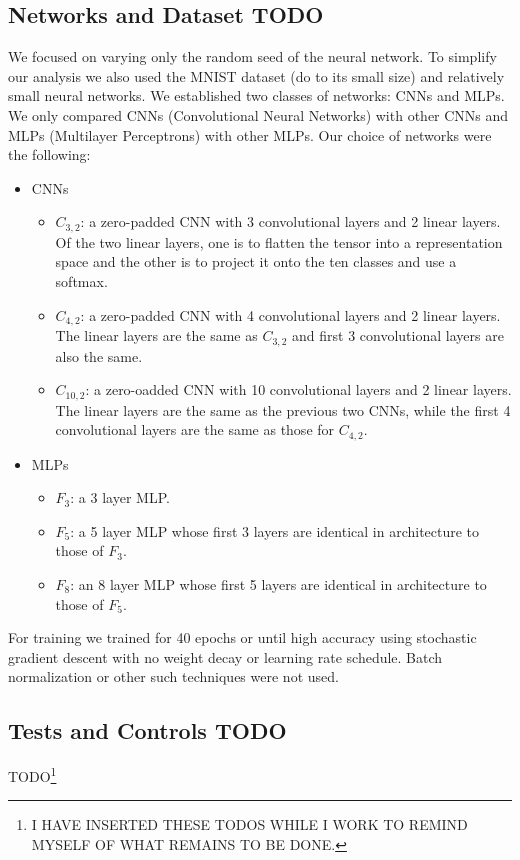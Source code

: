 \documentclass{article} %
\begin{document}
\subsection{Networks and Dataset TODO}
We focused on varying only the random seed of the neural network. To simplify our analysis we also used the MNIST dataset
(do to its small size) and relatively small neural networks. We established two classes of networks: CNNs and MLPs.
We only compared CNNs (Convolutional Neural Networks) with other CNNs and MLPs (Multilayer Perceptrons) with other MLPs.
Our choice of networks were the following:
\begin{itemize}
   \item CNNs
   \begin{itemize}
      \item \(C_{3,2}\): a zero-padded CNN with 3 convolutional layers and 2 linear layers. Of the two linear layers, one is to flatten the tensor into a representation space and the other is to project it onto the ten classes and use a softmax.
      \item \(C_{4,2}\): a zero-padded CNN with 4 convolutional layers and 2 linear layers. The linear layers are the same as \(C_{3,2}\) and first 3 convolutional layers are also the same.
      \item \(C_{10,2}\): a zero-oadded CNN with 10 convolutional layers and 2 linear layers. The linear layers are the same as the previous two CNNs, while the first 4 convolutional layers are the same as those for \(C_{4,2}\).
   \end{itemize}
   \item MLPs
   \begin{itemize}
      \item \(F_{3}\): a 3 layer MLP.
      \item \(F_{5}\): a 5 layer MLP whose first 3 layers are identical in architecture to those of \(F_{3}\).
      \item \(F_{8}\): an 8 layer MLP whose first 5 layers are identical in architecture to those of \(F_{5}\).
   \end{itemize}
\end{itemize}

For training we trained for 40 epochs or until high accuracy using stochastic gradient descent with no
weight decay or learning rate schedule. Batch normalization or other such techniques were not used.

\subsection{Tests and Controls TODO}
TODO\footnote{I HAVE INSERTED THESE TODOS WHILE I WORK TO REMIND MYSELF OF WHAT REMAINS TO BE DONE.}
\end{document}
